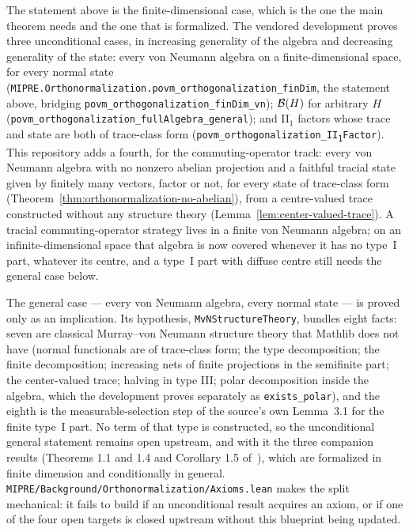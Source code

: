 \begin{remark}
\label{rem:orthonormalization-scope}
\leanok
The statement above is the finite-dimensional case, which is the one the main theorem
needs and the one that is formalized. The vendored development proves three
unconditional cases, in increasing generality of the algebra and decreasing generality of
the state: every von Neumann algebra on a finite-dimensional space, for every normal
state (\texttt{MIPRE.Orthonormalization.povm\_orthogonalization\_finDim}, the
statement above, bridging \texttt{povm\_orthogonalization\_finDim\_vn}); $\cal{B}(H)$
for arbitrary $H$ (\texttt{povm\_orthogonalization\_fullAlgebra\_general}); and II$_1$
factors whose trace and state are both of trace-class form
(\texttt{povm\_orthogonalization\_II\textsubscript{1}Factor}). This repository adds a
fourth, for the commuting-operator track: every von Neumann algebra with no nonzero abelian
projection and a faithful tracial state given by finitely many vectors, factor or not, for every
state of trace-class form (Theorem~\ref{thm:orthonormalization-no-abelian}), from a centre-valued
trace constructed without any structure theory (Lemma~\ref{lem:center-valued-trace}). A tracial
commuting-operator strategy lives in a finite von Neumann algebra; on an infinite-dimensional
space that algebra is now covered whenever it has no type~I part, whatever its centre, and a
type~I part with diffuse centre still needs the general case below.

The general case --- every von Neumann algebra, every normal state --- is proved only as
an implication. Its hypothesis, \texttt{MvNStructureTheory}, bundles eight facts: seven
are classical Murray--von Neumann structure theory that Mathlib does not have (normal
functionals are of trace-class form; the type decomposition; the finite decomposition;
increasing nets of finite projections in the semifinite part; the center-valued trace;
halving in type III; polar decomposition inside the algebra, which the development proves
separately as \texttt{exists\_polar}), and the eighth is the measurable-selection step of the source's own
Lemma~3.1 for the finite type~I part. No term of that type is constructed, so the
unconditional general statement remains open upstream, and with it the three companion
results (Theorems 1.1 and 1.4 and Corollary 1.5 of~\cite{dlS21}), which are formalized in
finite dimension and conditionally in general.
\texttt{MIPRE/Background/Orthonormalization/Axioms.lean} makes the split mechanical: it
fails to build if an unconditional result acquires an axiom, or if one of the four open
targets is closed upstream without this blueprint being updated.
\end{remark}

